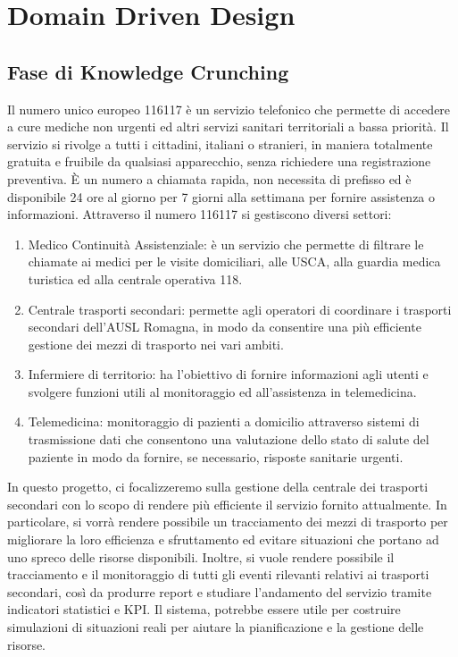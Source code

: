 \documentclass[12pt]{article}
\begin{document}
\section{Domain Driven Design}

\subsection{Fase di Knowledge Crunching}
Il numero unico europeo 116117 è un servizio telefonico che permette di accedere a cure mediche non urgenti ed altri servizi sanitari territoriali a bassa priorità.
Il servizio si rivolge a tutti i cittadini, italiani o stranieri, in maniera totalmente gratuita e fruibile da qualsiasi apparecchio, senza richiedere una registrazione preventiva.
\`E un numero a chiamata rapida, non necessita di prefisso ed è disponibile 24 ore al giorno per 7 giorni alla settimana per fornire assistenza o informazioni.
Attraverso il numero 116117 si gestiscono diversi settori:
\begin{enumerate}
    \item Medico Continuità Assistenziale: è un servizio che permette di filtrare le chiamate ai medici per le visite domiciliari, alle USCA, alla guardia medica turistica ed alla centrale operativa 118.
    \item Centrale trasporti secondari: permette agli operatori di coordinare i trasporti secondari dell'AUSL Romagna, in modo da consentire una più efficiente gestione dei mezzi di trasporto nei vari ambiti. 
    \item Infermiere di territorio: ha l'obiettivo di fornire informazioni agli utenti e svolgere funzioni utili al monitoraggio ed all'assistenza in telemedicina.
    \item Telemedicina: monitoraggio di pazienti a domicilio attraverso sistemi di trasmissione dati che consentono una valutazione dello stato di salute del paziente in modo da fornire, se necessario, risposte sanitarie urgenti.
\end{enumerate}

In questo progetto, ci focalizzeremo sulla gestione della centrale dei trasporti secondari con lo scopo di rendere più efficiente il servizio fornito attualmente. In particolare, si vorrà rendere possibile un tracciamento dei mezzi di trasporto per migliorare la loro efficienza e sfruttamento ed evitare situazioni che portano ad uno spreco delle risorse disponibili.
Inoltre, si vuole rendere possibile il tracciamento e il monitoraggio di tutti gli eventi rilevanti relativi ai trasporti secondari, così da produrre report e studiare l'andamento del servizio tramite indicatori statistici e KPI.
Il sistema, potrebbe essere utile per costruire simulazioni di situazioni reali per aiutare la pianificazione e la gestione delle risorse.
\end{document}
